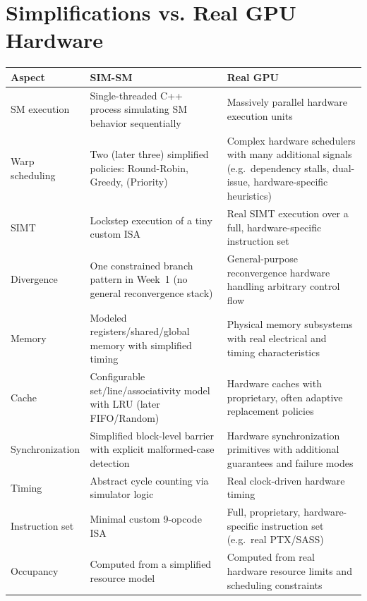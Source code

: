 \documentclass[11pt]{article}
\begin{document}
\section{Simplifications vs. Real GPU Hardware}
\label{sec:simplifications}

\begin{longtable}{@{}p{3cm}p{6cm}p{6cm}@{}}
\toprule
\textbf{Aspect} & \textbf{SIM-SM} & \textbf{Real GPU} \\
\midrule
\endhead
SM execution & Single-threaded C++ process simulating SM behavior
sequentially & Massively parallel hardware execution units \\
Warp scheduling & Two (later three) simplified policies: Round-Robin,
Greedy, (Priority) & Complex hardware schedulers with many additional
signals (e.g.\ dependency stalls, dual-issue, hardware-specific
heuristics) \\
SIMT & Lockstep execution of a tiny custom ISA & Real SIMT execution over
a full, hardware-specific instruction set \\
Divergence & One constrained branch pattern in Week~1 (no general
reconvergence stack) & General-purpose reconvergence hardware handling
arbitrary control flow \\
Memory & Modeled registers/shared/global memory with simplified timing &
Physical memory subsystems with real electrical and timing
characteristics \\
Cache & Configurable set/line/associativity model with LRU (later
FIFO/Random) & Hardware caches with proprietary, often adaptive
replacement policies \\
Synchronization & Simplified block-level barrier with explicit
malformed-case detection & Hardware synchronization primitives with
additional guarantees and failure modes \\
Timing & Abstract cycle counting via simulator logic & Real clock-driven
hardware timing \\
Instruction set & Minimal custom 9-opcode ISA & Full, proprietary,
hardware-specific instruction set (e.g.\ real PTX/SASS) \\
Occupancy & Computed from a simplified resource model & Computed from real
hardware resource limits and scheduling constraints \\
\bottomrule
\end{longtable}
\end{document}
